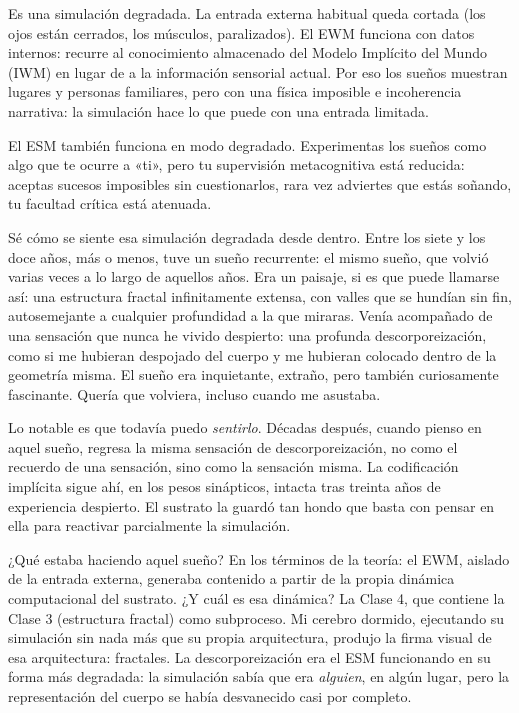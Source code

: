 \documentclass[11pt, twoside, openright]{book}
\begin{document}
Es una simulación degradada. La entrada externa habitual queda cortada (los ojos están cerrados, los músculos, paralizados). El EWM funciona con datos internos: recurre al conocimiento almacenado del Modelo Implícito del Mundo (IWM) en lugar de a la información sensorial actual. Por eso los sueños muestran lugares y personas familiares, pero con una física imposible e incoherencia narrativa: la simulación hace lo que puede con una entrada limitada.

El ESM también funciona en modo degradado. Experimentas los sueños como algo que te ocurre a «ti», pero tu supervisión metacognitiva está reducida: aceptas sucesos imposibles sin cuestionarlos, rara vez adviertes que estás soñando, tu facultad crítica está atenuada.

Sé cómo se siente esa simulación degradada desde dentro. Entre los siete y los doce años, más o menos, tuve un sueño recurrente: el mismo sueño, que volvió varias veces a lo largo de aquellos años. Era un paisaje, si es que puede llamarse así: una estructura fractal infinitamente extensa, con valles que se hundían sin fin, autosemejante a cualquier profundidad a la que miraras. Venía acompañado de una sensación que nunca he vivido despierto: una profunda descorporeización, como si me hubieran despojado del cuerpo y me hubieran colocado dentro de la geometría misma. El sueño era inquietante, extraño, pero también curiosamente fascinante. Quería que volviera, incluso cuando me asustaba.

Lo notable es que todavía puedo \textit{sentirlo}. Décadas después, cuando pienso en aquel sueño, regresa la misma sensación de descorporeización, no como el recuerdo de una sensación, sino como la sensación misma. La codificación implícita sigue ahí, en los pesos sinápticos, intacta tras treinta años de experiencia despierto. El sustrato la guardó tan hondo que basta con pensar en ella para reactivar parcialmente la simulación.

¿Qué estaba haciendo aquel sueño? En los términos de la teoría: el EWM, aislado de la entrada externa, generaba contenido a partir de la propia dinámica computacional del sustrato. ¿Y cuál es esa dinámica? La Clase 4, que contiene la Clase 3 (estructura fractal) como subproceso. Mi cerebro dormido, ejecutando su simulación sin nada más que su propia arquitectura, produjo la firma visual de esa arquitectura: fractales. La descorporeización era el ESM funcionando en su forma más degradada: la simulación sabía que era \textit{alguien}, en algún lugar, pero la representación del cuerpo se había desvanecido casi por completo.
\end{document}

